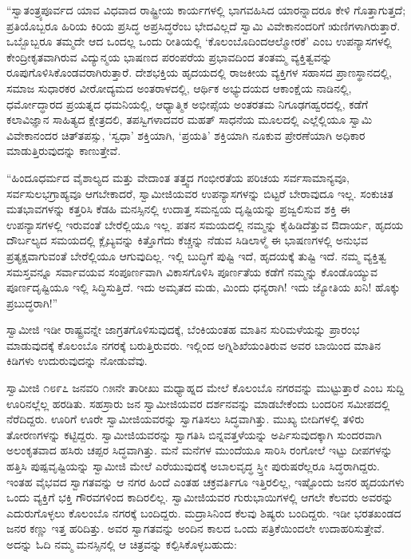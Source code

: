  “ಸ್ವಾತಂತ್ರ್ಯಪೂರ್ವದ ಯಾವ ವಿಧವಾದ ರಾಷ್ಟ್ರೀಯ ಕಾರ್ಯಗಳಲ್ಲಿ ಭಾಗವಹಿಸಿದ ಯಾರನ್ನಾದರೂ ಕೇಳಿ ಗೊತ್ತಾಗುತ್ತದೆ; ಪ್ರತಿಯೊಬ್ಬರೂ ಹಿರಿಯ ಕಿರಿಯ ಪ್ರಸಿದ್ಧ ಅಪ್ರಸಿದ್ಧರೆಂಬ ಭೇದವಿಲ್ಲದೆ ಸ್ವಾಮಿ ವಿವೇಕಾನಂದರಿಗೆ ಋಣಿಗಳಾಗಿರುತ್ತಾರೆ. ಒಬ್ಬೊಬ್ಬರೂ ತಮ್ಮದೇ ಆದ ಒಂದಲ್ಲ ಒಂದು ರೀತಿಯಲ್ಲಿ ‘ಕೊಲಂಬೊದಿಂದ\break ಆಲ್ಮೋರಕೆ’ ಎಂಬ ಉಪನ್ಯಾಸಗಳಲ್ಲಿ ಕೇಂದ್ರೀಕೃತವಾಗಿರುವ ವಿದ್ಯುನ್ಮಯ ಭಾಷಣದ ಪರಂಪರೆಯ ಪ್ರಭಾವದಿಂದ ತಂತಮ್ಮ ವ್ಯಕ್ತಿತ್ವವನ್ನು ರೂಪುಗೊಳಿಸಿಕೊಂಡವರಾಗಿರುತ್ತಾರೆ. ದೇಶಭಕ್ತಿಯ ಹೃದಯದಲ್ಲಿ ರಾಜಕೀಯ ವ್ಯಕ್ತಿಗಳ ಸಹಾಸದ ಪ್ರಾಣಸ್ಥಾನದಲ್ಲಿ, ಸಮಾಜ ಸುಧಾರಕರ ವೀರೋದ್ಯಮದ ಅಂತರಾಳದಲ್ಲಿ, ಆರ್ಥಿಕ ಅಭ್ಯುದಯದ ಆಕಾಂಕ್ಷೆಯ ನಾಡಿನಲ್ಲಿ, ಧರ್ಮೋದ್ಧಾರದ ಪ್ರಯತ್ನದ ಧಮನಿಯಲ್ಲಿ, ಆಧ್ಯಾತ್ಮಿಕ ಅಭೀಪ್ಸೆಯ ಅಂತರತಮ ನಿಗೂಢಗಹ್ವರದಲ್ಲಿ, ಕಡೆಗೆ ಕಲಾವಿಜ್ಞಾನ ಸಾಹಿತ್ಯದ ಕ್ಷೇತ್ರದಲಿ, ತಪಸ್ವಿಗಳಾದವರ ಮಹತ್ ಸಾಧನೆಯ ಮೂಲದಲ್ಲಿ ಎಲ್ಲೆಲ್ಲಿಯೂ ಸ್ವಾಮಿ ವಿವೇಕಾನಂದರ ಚಿತ್‍ತಪಸ್ಸು, ‘ಸ್ವಧಾ’ ಶಕ್ತಿಯಾಗಿ, ‘ಪ್ರಯತಿ’ ಶಕ್ತಿಯಾಗಿ ನೂಕುವ ಪ್ರೇರಣೆಯಾಗಿ ಅಧಿಕಾರ ಮಾಡುತ್ತಿರುವುದನ್ನು ಕಾಣುತ್ತೇವೆ. 

\newpage

 “ಹಿಂದೂಧರ್ಮದ ವೈಶಾಲ್ಯದ ಮತ್ತು ವೇದಾಂತ ತತ್ತ್ವದ ಗಂಭೀರತೆಯ ಪರಿಚಯ ಸರ್ವಸಾಮಾನ್ಯವೂ, ಸರ್ವಸುಲಭಗ್ರಾಹ್ಯವೂ ಆಗಬೇಕಾದರೆ, ಸ್ವಾಮೀಜಿಯವರ ಉಪನ್ಯಾಸಗಳನ್ನು ಬಿಟ್ಟರೆ ಬೇರಾವುದೂ ಇಲ್ಲ. ಸಂಕುಚಿತ ಮತಭಾವಗಳನ್ನು ಕತ್ತರಿಸಿ ಕೆಡಹಿ ಮನಸ್ಸಿನಲ್ಲಿ ಉದಾತ್ತ ಸಮನ್ವಯ ದೃಷ್ಟಿಯನ್ನು ಪ್ರಜ್ವಲಿಸುವ ಶಕ್ತಿ ಈ ಉಪನ್ಯಾಸಗಳಲ್ಲಿ ಇರುವಂತೆ ಬೇರೆಲ್ಲಿಯೂ ಇಲ್ಲ. ಪತನ ಸಮಯದಲ್ಲಿ ನಮ್ಮನ್ನು ಕೈಹಿಡಿದೆತ್ತುವ ಔದಾರ್ಯ, ಹೃದಯ ದೌರ್ಬಲ್ಯದ ಸಮಯದಲ್ಲಿ ಕ್ಲೈಬ್ಯವನ್ನು ಕಿತ್ತೊಗೆದು ಕೆಚ್ಚನ್ನು ನೆಡುವ ಸಿಡಿಲಾಳ್ಮೆ ಈ ಭಾಷಣಗಳಲ್ಲಿ ಅನುಭವ ಪ್ರತ್ಯಕ್ಷವಾಗುವಂತೆ ಬೇರೆಲ್ಲಿಯೂ ಆಗುವುದಿಲ್ಲ. ಇಲ್ಲಿ ಬುದ್ಧಿಗೆ ಪುಷ್ಟಿ ಇದೆ, ಹೃದಯಕ್ಕೆ ತುಷ್ಟಿ ಇದೆ. ನಮ್ಮ ವ್ಯಕ್ತಿತ್ವ ಸಮಸ್ತವನ್ನೂ ಸರ್ವಾವಯವ ಸಂಪೂರ್ಣವಾಗಿ ವಿಕಾಸಗೊಳಿಸಿ ಪೂರ್ಣತೆಯ ಕಡೆಗೆ ನಮ್ಮನ್ನು ಕೊಂಡೊಯ್ಯುವ ಪೂರ್ಣದೃಷ್ಟಿಯೂ ಇಲ್ಲಿ ಸಿದ್ಧಿಸುತ್ತಿದೆ. ಇದು ಅಮೃತದ ಮಡು, ಮಿಂದು ಧನ್ಯರಾಗಿ! ಇದು ಜ್ಯೋತಿಯ ಖನಿ! ಹೊಕ್ಕು ಪ್ರಬುದ್ಧರಾಗಿ!” 

 ಸ್ವಾಮೀಜಿ ಇಡೀ ರಾಷ್ಟ್ರವನ್ನೇ ಜಾಗ್ರತಗೊಳಿಸುವುದಕ್ಕೆ, ಬೆಂಕಿಯಂತಹ ಮಾತಿನ ಸುರಿಮಳೆಯನ್ನು ಪ್ರಾರಂಭ ಮಾಡುವುದಕ್ಕೆ ಕೊಲಂಬೊ ನಗರಕ್ಕೆ ಬರುತ್ತಿರುವರು. ಇಲ್ಲಿಂದ ಅಗ್ನಿಶಿಖೆಯಂತಿರುವ ಅವರ ಬಾಯಿಂದ ಮಾತಿನ ಕಿಡಿಗಳು ಉದುರುವುದನ್ನು ನೋಡುವೆವು. 

 ಸ್ವಾಮೀಜಿ ೧೮೯೭ ಜನವರಿ ೧೫ನೇ ತಾರೀಖು ಮಧ್ಯಾಹ್ನದ ಮೇಲೆ ಕೊಲಂಬೊ ನಗರವನ್ನು ಮುಟ್ಟುತ್ತಾರೆ ಎಂಬ ಸುದ್ದಿ ಊರಿನಲ್ಲೆಲ್ಲ ಹರಡಿತು. ಸಹಸ್ರಾರು ಜನ ಸ್ವಾಮೀಜಿಯವರ ದರ್ಶನವನ್ನು ಮಾಡಬೇಕೆಂದು ಬಂದರಿನ ಸಮೀಪದಲ್ಲಿ ನೆರೆದಿದ್ದರು. ಊರಿಗೆ ಊರೇ ಸ್ವಾಮೀಜಿಯವರನ್ನು ಸ್ವಾಗತಿಸಲು ಸಿದ್ಧವಾಗಿತ್ತು. ಮುಖ್ಯ ಬೀದಿಗಳಲ್ಲಿ ತಳಿರು ತೋರಣಗಳನ್ನು ಕಟ್ಟಿದ್ದರು. ಸ್ವಾಮೀಜಿಯವರನ್ನು ಸ್ವಾಗತಿಸಿ ಬಿನ್ನವತ್ತಳೆಯನ್ನು ಅರ್ಪಿಸುವುದಕ್ಕಾಗಿ ಸುಂದರವಾಗಿ ಅಲಂಕೃತವಾದ ಹಸಿರು ಚಪ್ಪರ ಸಿದ್ಧವಾಗಿತ್ತು. ಮನೆ ಮನೆಗಳ ಮುಂದೆಯೂ ಸಾರಿಸಿ ರಂಗೋಲೆ ಇಟ್ಟು ದೀಪಗಳನ್ನು ಹತ್ತಿಸಿ ಪುಷ್ಪವೃಷ್ಟಿಯನ್ನು ಸ್ವಾಮೀಜಿ ಮೇಲೆ ಎರೆಯುವುದಕ್ಕೆ ಅಬಾಲವೃದ್ಧ ಸ್ರ್ತೀ ಪುರುಷರೆಲ್ಲರೂ ಸಿದ್ಧರಾಗಿದ್ದರು. ಇಂತಹ ವೈಭವದ ಸ್ವಾಗತವನ್ನು ಆ ನಗರ ಹಿಂದೆ ಎಂತಹ ಚಕ್ರವರ್ತಿಗೂ ಇತ್ತಿರಲಿಲ್ಲ, ಇಷ್ಟೊಂದು ಜನರ ಹೃದಯಗಳು ಒಂದು ವ್ಯಕ್ತಿಗೆ ಭಕ್ತಿ ಗೌರವಗಳಿಂದ ಕಾದಿರಲಿಲ್ಲ. ಸ್ವಾಮೀಜಿಯವರ ಗುರುಭಾಯಿಗಳಲ್ಲಿ ಆಗಲೇ ಕೆಲವರು ಅವರನ್ನು ಎದುರುಗೊಳ್ಳಲು ಕೊಲಂಬೊ ನಗರಕ್ಕೆ ಬಂದಿದ್ದರು. ಮದ್ರಾಸಿನಿಂದ ಕೆಲವು ಶಿಷ್ಯರು ಬಂದಿದ್ದರು. ಇಡೀ ಭರತಖಂಡದ ಜನರ ಕಣ್ಣು ಇತ್ತ ಹರಿದಿತ್ತು. ಅವರ ಸ್ವಾಗತವನ್ನು ಅಂದಿನ ಕಾಲದ ಒಂದು ಪತ್ರಿಕೆಯಿಂದಲೇ ಉದಾಹರಿಸುತ್ತೇವೆ. ಅದನ್ನು ಓದಿ ನಮ್ಮ ಮನಸ್ಸಿನಲ್ಲಿ ಆ ಚಿತ್ರವನ್ನು ಕಲ್ಪಿಸಿಕೊಳ್ಳಬಹುದು: 

